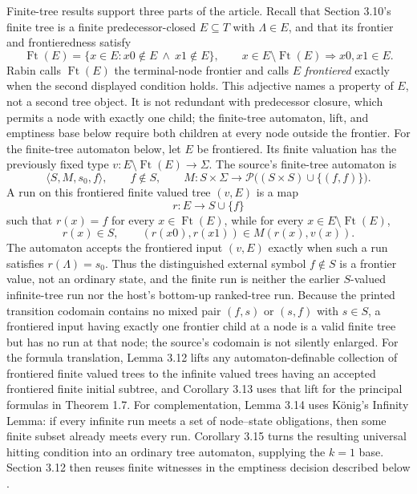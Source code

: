 Finite-tree results support three parts of the article.  Recall that Section
3.10's finite tree is a finite predecessor-closed \(E\subseteq T\) with
\(\Lambda\in E\), and that its frontier and frontieredness satisfy
\[
 \operatorname{Ft}(E)=\{x\in E:x0\notin E\ \land\ x1\notin E\},
 \qquad
 x\in E\setminus\operatorname{Ft}(E)\Longrightarrow x0,x1\in E.
\]
Rabin calls \(\operatorname{Ft}(E)\) the terminal-node frontier and calls
\(E\) \emph{frontiered} exactly when the second displayed condition holds.
This adjective names a property of \(E\), not a second tree object.  It is not
redundant with predecessor closure, which permits a node with exactly one
child; the finite-tree automaton, lift, and emptiness base below require both
children at every node outside the frontier.
For the finite-tree automaton below, let \(E\) be frontiered.  Its finite
valuation has the previously fixed type
\(v:E\setminus\operatorname{Ft}(E)\to\Sigma\).  The source's
finite-tree automaton is
\[
 \langle S,M,s_0,f\rangle,
 \qquad f\notin S,
 \qquad
M:S\times\Sigma\longrightarrow
  \mathcal P\bigl((S\times S)\cup\{(f,f)\}\bigr).
\]
A run on this frontiered finite valued tree \((v,E)\) is a map
\[
 r:E\longrightarrow S\cup\{f\}
\]
such that \(r(x)=f\) for every \(x\in\operatorname{Ft}(E)\), while for every
\(x\in E\setminus\operatorname{Ft}(E)\),
\[
 r(x)\in S,
 \qquad
 (r(x0),r(x1))\in M(r(x),v(x)).
\]
The automaton accepts the frontiered input \((v,E)\) exactly when such a run
satisfies \(r(\Lambda)=s_0\).  Thus the distinguished external symbol
\(f\notin S\) is a frontier value, not an ordinary state, and the finite run is neither the
earlier \(S\)-valued infinite-tree run nor the host's bottom-up ranked-tree
run.  Because the printed transition codomain contains no mixed pair
\((f,s)\) or \((s,f)\) with \(s\in S\), a frontiered input having exactly one
frontier child at a node is a valid finite tree but has no run at that node; the
source's codomain is not silently enlarged.  For the formula translation,
Lemma 3.12 lifts any automaton-definable collection of
frontiered finite valued trees to the infinite valued trees having an accepted
frontiered finite initial subtree, and Corollary 3.13 uses that lift for the
principal formulas in Theorem 1.7.
For complementation, Lemma 3.14 uses K\"onig's Infinity Lemma: if every
infinite run meets a set of node--state obligations, then some finite subset
already meets every run.  Corollary 3.15 turns the resulting universal hitting
condition into an ordinary tree automaton, supplying the \(k=1\) base.
Section 3.12 then reuses finite witnesses in the emptiness decision described
below
\cite[pp.~30--32]{Rabin1969}.

